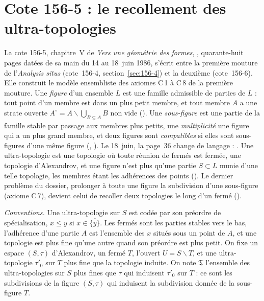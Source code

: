 \section[Cote 156-5 : le recollement des ultra-topologies]{Cote 156-5 : le recollement des ultra-topologies\protect{}}\label{sec:156-5}

La cote 156-5, chapitre~V de \emph{Vers une géométrie des formes}, , quarante-huit pages datées de sa main du 14 au 18~juin 1986, s'écrit entre la première mouture de l'\emph{Analysis situs} (cote~156-4, section~\ref{sec:156-4}) et la deuxième (cote~156-6). Elle construit le modèle ensembliste des axiomes C\,1 à C\,8 de la première mouture. Une \emph{figure} d'un ensemble $L$ est une famille admissible de parties de $L$ : tout point d'un membre est dans un plus petit membre, et tout membre $A$ a une strate ouverte $A^\circ = A \smallsetminus \bigcup_{B \subsetneq A} B$ non vide (). Une \emph{sous-figure} est une partie de la famille stable par passage aux membres plus petits, une \emph{multiplicité} une figure qui a un plus grand membre, et deux figures sont \emph{compatibles} si elles sont sous-figures d'une même figure (, ). Le 18~juin, la page~36 change de langage : . Une ultra-topologie est une topologie où toute réunion de fermés est fermée, une topologie d'Alexandrov, et une figure n'est plus qu'une partie $S \subset L$ munie d'une telle topologie, les membres étant les adhérences des points (). Le dernier problème du dossier, prolonger à toute une figure la subdivision d'une sous-figure (axiome C\,7), devient celui de recoller deux topologies le long d'un fermé ().

\noindent\emph{Conventions.} Une ultra-topologie sur $S$ est codée par son préordre de spécialisation, $x \leq y$ si $x \in \overline{\{y\}}$. Les fermés sont les parties stables vers le bas, l'adhérence d'une partie $A$ est l'ensemble des $x$ situés sous un point de $A$, et une topologie est plus fine qu'une autre quand son préordre est plus petit. On fixe un espace $(S, \tau)$ d'Alexandrov, un fermé $T$, l'ouvert $U = S \smallsetminus T$, et une ultra-topologie $\tau'_0$ sur $T$ plus fine que la topologie induite. On note $\mathfrak T$ l'ensemble des ultra-topologies sur $S$ plus fines que $\tau$ qui induisent $\tau'_0$ sur $T$ : ce sont les subdivisions de la figure $(S, \tau)$ qui induisent la subdivision donnée de la sous-figure $T$.

